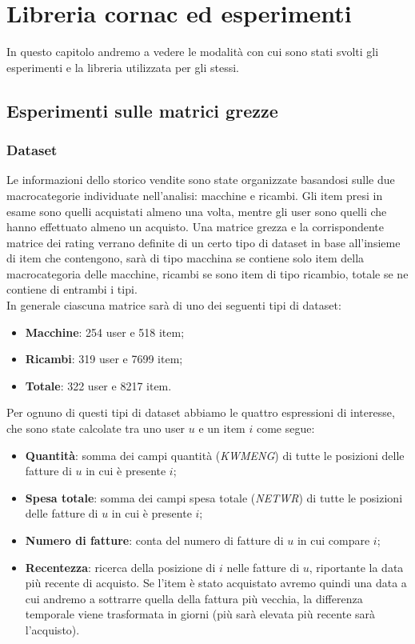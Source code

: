 \hypertarget{(chap:capitolo5)}{}
\chapter{Libreria cornac ed esperimenti}
In questo capitolo andremo a vedere le modalità con cui sono stati svolti gli esperimenti e la libreria utilizzata per gli stessi.
\section{Esperimenti sulle matrici grezze}
\subsection{Dataset}
Le informazioni dello storico vendite sono state organizzate basandosi sulle due macrocategorie individuate nell'analisi: macchine e ricambi.
Gli item presi in esame sono quelli acquistati almeno una volta, mentre gli user sono quelli che hanno effettuato almeno un acquisto.
Una matrice grezza e la corrispondente matrice dei rating verrano definite di un certo tipo di dataset in base all'insieme di item che contengono, sarà di tipo macchina se contiene solo item della macrocategoria delle macchine, ricambi se sono item di tipo ricambio, totale se ne contiene di entrambi i tipi.\\
In generale ciascuna matrice sarà di uno dei seguenti tipi di dataset:

\begin{itemize}
    \item \textbf{Macchine}: 254 user e 518 item;
    \item \textbf{Ricambi}: 319 user e 7699 item;
    \item \textbf{Totale}: 322 user e 8217 item.
\end{itemize}

Per ognuno di questi tipi di dataset abbiamo le quattro espressioni di interesse, che sono state calcolate tra uno user $u$ e un item $i$ come segue:
\begin{itemize}
    \item \textbf{Quantità}: somma dei campi quantità (\textit{KWMENG}) di tutte le posizioni delle fatture di $u$ in cui è presente $i$;
    \item \textbf{Spesa totale}: somma dei campi spesa totale (\textit{NETWR}) di tutte le posizioni delle fatture di $u$ in cui è presente $i$;
    \item \textbf{Numero di fatture}: conta del numero di fatture di $u$ in cui compare $i$;
    \item \textbf{Recentezza}: ricerca della posizione di $i$ nelle fatture di $u$, riportante la data più recente di acquisto. Se l'item è stato acquistato avremo quindi una data a cui andremo a sottrarre quella della fattura più vecchia, la differenza temporale viene trasformata in giorni (più sarà elevata più recente sarà l'acquisto).
\end{itemize}

